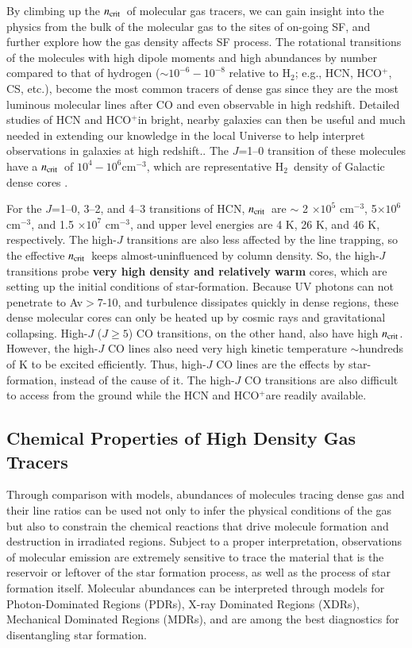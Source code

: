 \documentclass[legal,11pt]{article}
\def\cmt   {cm$^{-3}$\,}
\def\,{\thinspace}
\def\Htwo{H$_2$}
\def\ncrit{$n_{\rm crit}$}
\def\HCOP       {HCO$^{+}$}
\def\Htwo       {H$_2$}
\begin{document}
By climbing up the \ncrit\ of  molecular gas tracers, we can gain insight into
the physics from the bulk of the molecular gas to the sites of on-going SF, and
further explore how the gas density affects SF process.  The rotational
transitions of the molecules with high dipole moments and high abundances by
number compared to that of hydrogen ($\sim 10^{-6}-10^{-8}$ relative to \Htwo;
e.g., HCN, \HCOP, CS, etc.), become the most common tracers of dense gas since
they are the most luminous molecular lines after CO and even observable in high
redshift. Detailed studies of HCN and \HCOP in bright, nearby galaxies can then
be useful
and much needed in extending our knowledge in the local Universe to
help interpret observations in galaxies at
high redshift.. The $J$=1--0
transition of these molecules have a \ncrit\  of $10^4 - 10^6$\cmt, which are
representative \Htwo\ density of Galactic dense cores
\citep[e.g.,][]{Plume1997,weg05}. 



For the $J$=1--0, 3--2, and 4--3 transitions of HCN,  \ncrit\ are $\sim$ 2
$\times 10^5$ \cmt, 5$\times 10^6$ \cmt, and 1.5 $\times 10^7$ \cmt, and upper
level energies are 4 K, 26 K, and 46 K, respectively. The high-$J$ transitions
are also less affected by the line trapping, so the effective \ncrit\ keeps
almost-uninfluenced by column density. So, the high-$J$ transitions probe {\bf very high density and relatively warm} cores, which are setting up the initial conditions of star-formation.
Because UV photons can not penetrate to Av$>$7-10, and turbulence dissipates quickly in dense regions, these dense molecular cores can only be heated up by cosmic rays and gravitational collapsing.  
High-$J$ ($J\ge 5$) CO transitions, on the other hand, also have high \ncrit. 
However, the high-$J$ CO lines also need very high kinetic temperature $\sim$hundreds of K to be excited efficiently. Thus, high-$J$ CO lines are 
the effects by star-formation, instead of the cause of it. The high-$J$ CO transitions are also difficult to
access from the ground while the HCN and \HCOP are readily available.




\subsection{Chemical Properties of High Density Gas Tracers  }

Through comparison with models, abundances of molecules tracing dense gas and
their line ratios can be used not only to infer the physical conditions of the
gas but also to constrain the chemical reactions that drive molecule formation
and destruction in irradiated regions\citep[e.g.,][]{vandishoeck1998}. Subject
to a proper interpretation, observations of molecular emission are extremely
sensitive to trace the material that is the reservoir or leftover of the star
formation process, as well as the process of star formation itself. Molecular
abundances can be interpreted through models for Photon-Dominated Regions
(PDRs), X-ray Dominated Regions (XDRs), Mechanical Dominated Regions (MDRs),
and are among the best diagnostics for disentangling star formation.
\end{document}
